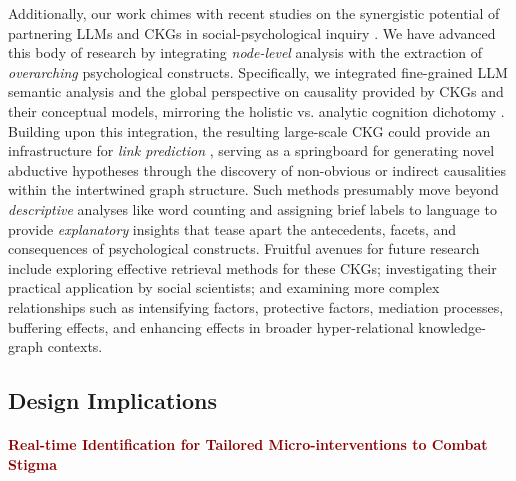 Additionally, our work chimes with recent studies on the synergistic potential of partnering LLMs and CKGs in social-psychological inquiry \cite{ckg_llm_tong_2024, kg_carta_2023, ckg_uleman_2021, ckg_borsboom_2021, kg_llm_pan_2024, kg_psych_crielaard_2022}. 
We have advanced this body of research by integrating \textit{node-level} analysis with the extraction of \textit{overarching} psychological constructs. 
Specifically, we integrated fine-grained LLM semantic analysis and the global perspective on causality provided by CKGs and their conceptual models, mirroring the holistic vs. analytic cognition dichotomy \cite{human_psych_nisbett_2001}. 
Building upon this integration, the resulting large-scale CKG could provide an infrastructure for \textit{link prediction} \cite{ckg_llm_tong_2024}, serving as a springboard for generating novel abductive hypotheses through the discovery of non-obvious or indirect causalities within the intertwined graph structure.
Such methods presumably move beyond \textit{descriptive} analyses like word counting and assigning brief labels to language \cite{theory_nlp_boyd_2021} to provide \textit{explanatory} insights that tease apart the antecedents, facets, and consequences of psychological constructs.
Fruitful avenues for future research include exploring effective retrieval methods for these CKGs; investigating their practical application by social scientists; and examining more complex relationships such as intensifying factors, protective factors, mediation processes, buffering effects, and enhancing effects in broader hyper-relational knowledge-graph contexts.



\subsection{Design Implications}

\paragraph{\textcolor{darkred}{\textbf{Real-time Identification for Tailored Micro-interventions to Combat Stigma}}}



